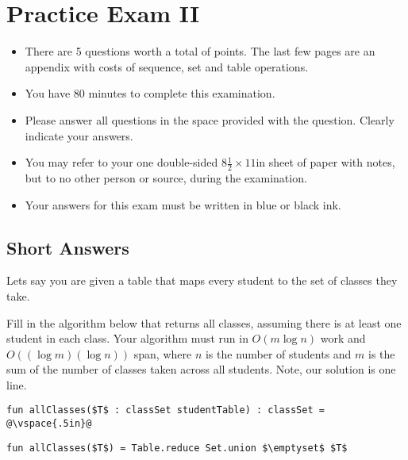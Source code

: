 \chapter{Practice Exam II}

\begin{preamble}
\newcommand{\numquestions}{5}

\begin{itemize}
\item There are \numquestions{} questions worth a total of \numpoints{} points.
  The last few pages are an appendix with costs of sequence,
  set and table operations.
\item You have 80 minutes to complete this examination.
\item Please answer all questions in the space provided with the
  question.  Clearly indicate your answers.
\item You may refer to your one double-sided $8\frac{1}{2} \times 11$in
  sheet of paper with notes, but to no other person or source, during the
  examination.

\item Your answers for this exam must be written in blue or black ink.

\end{itemize}
\end{preamble}

%


\section{Short Answers}

\begin{problem}[4p][Classes]



Lets say you are given a table that maps every student to the set of
classes they take. 

\answer
Fill in the algorithm below that returns all classes,
assuming there is at least one student in each class.  Your algorithm
must run in $O(m \log n)$ work and $O((\log m)(\log n))$ span, where
$n$ is the number of students and $m$ is the sum of the number of
classes taken across all students.    Note, our solution is one line.


\vspace{.3in}
\begin{lstlisting}[numbers=none]
fun allClasses($T$ : classSet studentTable) : classSet = 
@\vspace{.5in}@
\end{lstlisting}

\sol
\begin{lstlisting}[numbers=none]
fun allClasses($T$) = Table.reduce Set.union $\emptyset$ $T$
\end{lstlisting}

\end{problem}


